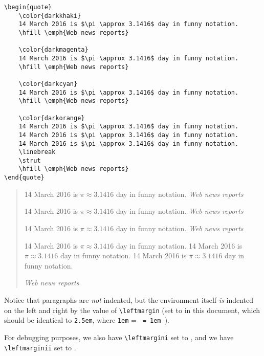 \begin{singlespace}
\color{darkblue}
\begin{verbatim}
\begin{quote}
    \color{darkkhaki}
    14 March 2016 is $\pi \approx 3.1416$ day in funny notation.
    \hfill \emph{Web news reports}

    \color{darkmagenta}
    14 March 2016 is $\pi \approx 3.1416$ day in funny notation.
    \hfill \emph{Web news reports}

    \color{darkcyan}
    14 March 2016 is $\pi \approx 3.1416$ day in funny notation.
    \hfill \emph{Web news reports}

    \color{darkorange}
    14 March 2016 is $\pi \approx 3.1416$ day in funny notation.
    14 March 2016 is $\pi \approx 3.1416$ day in funny notation.
    14 March 2016 is $\pi \approx 3.1416$ day in funny notation.
    \linebreak
    \strut
    \hfill \emph{Web news reports}
\end{quote}
\end{verbatim}
\end{singlespace}
%
\begin{quote}
    \color{darkkhaki}
    14 March 2016 is $\pi \approx 3.1416$ day in funny notation.
    \hfill \emph{Web news reports}

    \color{darkmagenta}
    14 March 2016 is $\pi \approx 3.1416$ day in funny notation.
    \hfill \emph{Web news reports}

    \color{darkcyan}
    14 March 2016 is $\pi \approx 3.1416$ day in funny notation.
    \hfill \emph{Web news reports}

    \color{darkorange}
    14 March 2016 is $\pi \approx 3.1416$ day in funny notation.
    14 March 2016 is $\pi \approx 3.1416$ day in funny notation.
    14 March 2016 is $\pi \approx 3.1416$ day in funny notation.
    \linebreak
    \strut
    \hfill \emph{Web news reports}
\end{quote}

Notice that  paragraphs
are \emph{not} indented, but the environment
itself \emph{is} indented on the left and right by
the value of \verb=\leftmargin= (set to
\texttt{\the\leftmargin} in this document, which
should be identical to \verb=2.5em=, where
\verb=1em= = \texttt{ = 1em \the{}}).

For debugging purposes, we also have
\verb=\leftmargini= set to
\texttt{\the\leftmargini}, and we have
\verb=\leftmarginii= set to
\texttt{\the\leftmarginii}.

